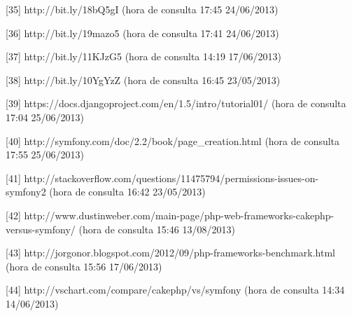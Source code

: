 [35] http://bit.ly/18bQ5gI (hora de consulta 17:45 24/06/2013)

[36] http://bit.ly/19mazo5 (hora de consulta 17:41 24/06/2013)

[37] http://bit.ly/11KJzG5 (hora de consulta 14:19 17/06/2013)

[38] http://bit.ly/10YgYzZ  (hora de consulta 16:45 23/05/2013)

[39] https://docs.djangoproject.com/en/1.5/intro/tutorial01/ (hora de consulta 17:04 25/06/2013)

[40] http://symfony.com/doc/2.2/book/page\_creation.html (hora de consulta 17:55 25/06/2013)

[41] http://stackoverflow.com/questions/11475794/permissions-issues-on-symfony2  (hora de consulta 16:42 23/05/2013)

[42] http://www.dustinweber.com/main-page/php-web-frameworks-cakephp-versus-symfony/ (hora de consulta 15:46 13/08/2013)

[43] http://jorgonor.blogspot.com/2012/09/php-frameworks-benchmark.html (hora de consulta 15:56 17/06/2013)

[44] http://vschart.com/compare/cakephp/vs/symfony (hora de consulta 14:34 14/06/2013)

